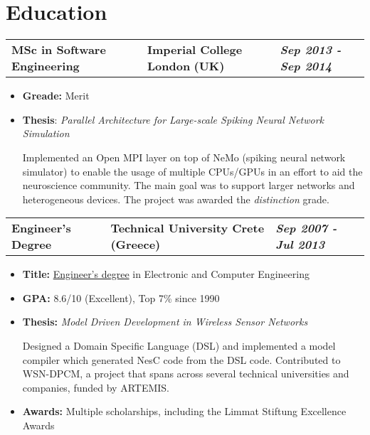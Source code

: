 \documentclass[a4paper,10pt]{article}
\newcommand*{\mahogany}{\textcolor{darkmahogany}}
\newcommand{\jobtitle}[4]{
\vspace{0.3cm}
\begin{tabularx}
{\textwidth}
{ >{\raggedright\arraybackslash}p{6.5cm}
  >{\raggedright\arraybackslash}X
  >{\raggedleft\arraybackslash}p{4cm} }
\fontsize{13pt}{15pt}\selectfont\textbf{#1} &

\large\textbf{\mahogany{#2}} \normalsize\textbf{(#3)} &
\textit{\large\textbf{#4}}
\end{tabularx}
\vspace{-0.4cm}
}
\begin{document}
\section{Education}
\jobtitle{MSc in Software Engineering}{Imperial College London}{UK}{Sep 2013 - Sep 2014}
\begin{itemize}[leftmargin=.27in,label=] \setlength\itemsep{0cm}
\vspace{0.2cm}
\item\textbf{Greade:} Merit
\item \normalsize \textbf{Thesis}:
\textit{Parallel Architecture for Large-scale Spiking Neural Network Simulation}
\vspace{-0.1cm}

Implemented an Open MPI layer on top of NeMo (spiking neural network simulator) to enable the usage of multiple CPUs/GPUs in an effort to aid the neuroscience community.  The main goal was to support larger networks and heterogeneous devices. The project was awarded the \textit{distinction} grade.

\end{itemize}

\vspace{0.1cm}
\jobtitle{Engineer's Degree}{Technical University Crete}{Greece}{Sep 2007 - Jul 2013}
\vspace{0.2cm}

\begin{itemize}[leftmargin=.27in,label=]\setlength\itemsep{-0.1cm}
\item \textbf{Title:} \href{https://en.wikipedia.org/wiki/Engineer's_degree#Europe}{Engineer's degree} in Electronic and Computer Engineering

\item\textbf{GPA:} 8.6/10 (Excellent), Top 7\% since 1990

\item \textbf{Thesis:}
\textit{Model Driven Development in Wireless Sensor Networks}
\vspace{-0.1cm}

Designed a Domain Specific Language (DSL) and implemented a model compiler which generated NesC code from the DSL code. Contributed to WSN-DPCM, a project that spans across several technical universities and companies, funded by ARTEMIS.

\item \textbf{Awards:} Multiple scholarships, including the Limmat Stiftung Excellence Awards

\end{itemize}
\end{document}
